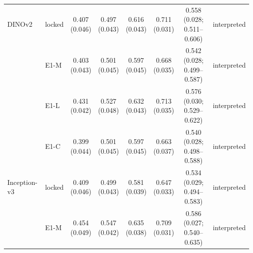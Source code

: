 \begin{longtable}{@{}p{3.6cm}lcccccp{2.6cm}@{}}
\addlinespace[2pt]
DINOv2 & locked & \makecell{0.407\\{\scriptsize (0.046)}} & \makecell{0.497\\{\scriptsize (0.043)}} & \makecell{0.616\\{\scriptsize (0.043)}} & \makecell{0.711\\{\scriptsize (0.031)}} & \makecell{0.558\\{\scriptsize (0.028; 0.511--0.606)}} & interpreted \\
 & E1-M & \makecell{0.403\\{\scriptsize (0.043)}} & \makecell{0.501\\{\scriptsize (0.045)}} & \makecell{0.597\\{\scriptsize (0.045)}} & \makecell{0.668\\{\scriptsize (0.035)}} & \makecell{0.542\\{\scriptsize (0.028; 0.499--0.587)}} & interpreted \\
 & E1-L & \makecell{0.431\\{\scriptsize (0.042)}} & \makecell{0.527\\{\scriptsize (0.048)}} & \makecell{0.632\\{\scriptsize (0.043)}} & \makecell{0.713\\{\scriptsize (0.035)}} & \makecell{0.576\\{\scriptsize (0.030; 0.529--0.622)}} & interpreted \\
 & E1-C & \makecell{0.399\\{\scriptsize (0.044)}} & \makecell{0.501\\{\scriptsize (0.045)}} & \makecell{0.597\\{\scriptsize (0.045)}} & \makecell{0.663\\{\scriptsize (0.037)}} & \makecell{0.540\\{\scriptsize (0.028; 0.498--0.588)}} & interpreted \\
\addlinespace[2pt]
Inception-v3 & locked & \makecell{0.409\\{\scriptsize (0.046)}} & \makecell{0.499\\{\scriptsize (0.043)}} & \makecell{0.581\\{\scriptsize (0.039)}} & \makecell{0.647\\{\scriptsize (0.033)}} & \makecell{0.534\\{\scriptsize (0.029; 0.494--0.583)}} & interpreted \\
 & E1-M & \makecell{0.454\\{\scriptsize (0.049)}} & \makecell{0.547\\{\scriptsize (0.042)}} & \makecell{0.635\\{\scriptsize (0.038)}} & \makecell{0.709\\{\scriptsize (0.031)}} & \makecell{0.586\\{\scriptsize (0.027; 0.540--0.635)}} & interpreted \\

\end{longtable}

